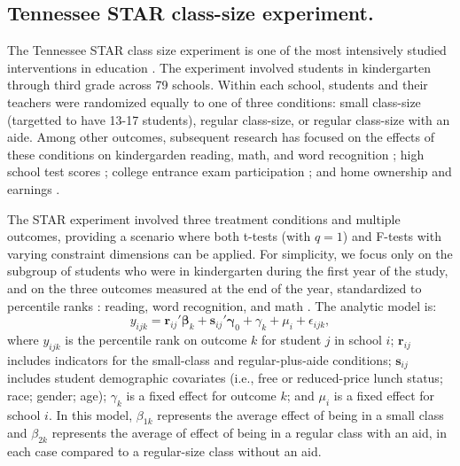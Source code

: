 \documentclass[12pt]{article}\usepackage[]{graphicx}\usepackage[]{color}
\newcommand{\bm}{\mathbf}
\newcommand{\bs}{\boldsymbol}
\begin{document}
\subsection{Tennessee STAR class-size experiment.} 

The Tennessee STAR class size experiment is one of the most intensively studied interventions in education \citep[for a detailed review, see][]{Schanzenbach2006what}.  The experiment involved students in kindergarten through third grade across 79 schools. Within each school, students and their teachers were randomized equally to one of three conditions: small class-size (targetted to have 13-17 students), regular class-size, or regular class-size with an aide.
Among other outcomes, subsequent research has focused on the effects of these conditions on kindergarden reading, math, and word recognition \citep{Achilles2008tennessee}; high school test scores \citep{Schanzenbach2006what}; college entrance exam participation \citep{Krueger2001effect}; and home ownership and earnings \citep{Chetty2011how}.

The STAR experiment involved three treatment conditions and multiple outcomes, providing a scenario where both t-tests (with $q = 1$) and F-tests with varying constraint dimensions can be applied. 
For simplicity, we focus only on the subgroup of students who were in kindergarten during the first year of the study, and on the three outcomes measured at the end of the year, standardized to percentile ranks \citep{Krueger2001effect}: reading, word recognition, and math \citep{Achilles2008tennessee}.
The analytic model is: 
\begin{equation}
y_{ijk} = \bm{r}_{ij}'\bs\beta_k + \bm{s}_{ij}'\bs\gamma_0 + \gamma_k + \mu_i + \epsilon_{ijk}, 
\end{equation}
where $y_{ijk}$ is the percentile rank on outcome $k$ for student $j$ in school $i$; $\bm{r}_{ij}$ includes indicators for the small-class and regular-plus-aide conditions; $\bm{s}_{ij}$ includes student demographic covariates (i.e., free or reduced-price lunch status; race; gender; age); $\gamma_k$ is a fixed effect for outcome $k$; and $\mu_i$ is a fixed effect for school $i$. 
In this model, $\beta_{1k}$ represents the average effect of being in a small class and $\beta_{2k}$ represents the average of effect of being in a regular class with an aid, in each case compared to a regular-size class without an aid.
\end{document}
